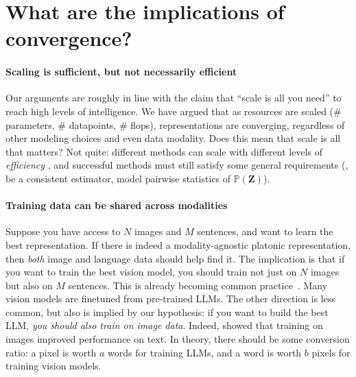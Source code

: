 \documentclass{article}
\newcommand{\jh}[1]{{\;\color{red}JH: #1}}
\newcommand{\phil}[1]{{\color{orange}PI: #1}}
\theoremstyle{plain}
\theoremstyle{definition}
\theoremstyle{remark}
\begin{document}
\section{What are the implications of convergence?}\label{sec:implications}

\paragraph{Scaling is sufficient, but not necessarily efficient} Our arguments are roughly in line with the claim that ``scale is all you need'' to reach high levels of intelligence. We have argued that as resources are scaled (\# parameters, \# datapoints, \# flops), representations are converging, regardless of other modeling choices and even data modality. %
Does this mean that scale is all that matters? Not quite: different methods can scale with different levels of \textit{efficiency} \citep{hestness2017deep,kaplan2020scaling}, and successful methods must still satisfy some general requirements (\eg, be a consistent estimator, model pairwise statistics of $\mathbb{P}(\mathbf{Z})$).

\paragraph{Training data can be shared across modalities} Suppose you have access to $N$ images and $M$ sentences, and want to learn the best representation. If there is indeed a modality-agnostic platonic representation, then \emph{both} image and language data should help find it.
The implication is that if you want to train the best vision model, you should train not just on  $N$ images but also on $M$ sentences. This is already becoming common practice~\cite{achiam2023gpt, radford2021learning}. Many vision models are finetuned from pre-trained LLMs. The other direction is less common, but also is implied by our hypothesis: if you want to build the best LLM, \textit{you should also train on image data}. Indeed, \citet{achiam2023gpt} showed that training on images improved performance on text. %
In theory, there should be some conversion ratio: a pixel is worth $a$ words for training LLMs, and a word is worth $b$ pixels for training vision models.
\end{document}
